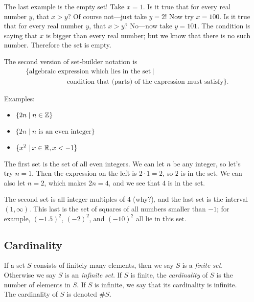 \documentclass{tufte-book}
\begin{document}
The last example is the empty set! Take $x = 1$. Is it true that for every real number $y$, that $x > y$? Of course not---just take $y = 2$! Now try $x = 100$. Is it true that for every real number $y$, that $x > y$? No---now take $y = 101$. The condition is saying that $x$ is bigger than every real number; but we know that there is no such number. Therefore the set is empty.

The second version of set-builder notation is
\begin{gather*}
  \{ \text{algebraic expression which lies in the set} \mid \\
  \qquad \qquad \qquad \text{condition that (parts) of the expression must satisfy}\}.
\end{gather*}

Examples:
\begin{itemize}
    \item $\{2n \mid n \in \mathbb{Z}\}$
    \item $\{2n \mid n \text{ is an even integer}\}$
    \item $\{x^2 \mid x \in \mathbb{R}, x < -1\}$
\end{itemize}
The first set is the set of all even integers. We can let $n$ be any integer, so let's try $n = 1$. Then the expression on the left is $2 \cdot 1 = 2$, so $2$ is in the set. We can also let $n = 2$, which makes $2n = 4$, and we see that $4$ is in the set. 

The second set is all integer multiples of $4$ (why?), and the last set is the interval $(1, \infty)$. This last is the set of squares of all numbers smaller than $-1$; for example, $(-1.5)^2$, $(-2)^2$, and $(-10)^2$ all lie in this set.


\subsection{Cardinality}
\label{sec:cardinality}

\begin{definition}
  If a set $S$ consists of finitely many elements, then we say $S$ is a \emph{finite set}. Otherwise we say $S$ is an \emph{infinite set}. If $S$ is finite, the \emph{cardinality} of $S$ is the number of elements in $S$. If $S$ is infinite, we say that its cardinality is infinite. The cardinality of $S$ is denoted $\# S$.
\end{definition}
\end{document}
